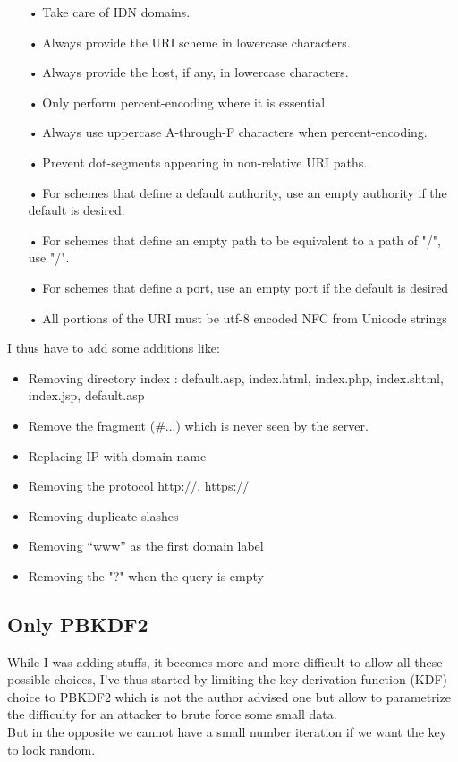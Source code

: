 \documentclass{eplmastersthesis}
\begin{document}
\begin{itemize}
\item[•] Take care of IDN domains.
\item[•] Always provide the URI scheme in lowercase characters.
\item[•] Always provide the host, if any, in lowercase characters.
\item[•] Only perform percent-encoding where it is essential.
\item[•] Always use uppercase A-through-F characters when percent-encoding.
\item[•] Prevent dot-segments appearing in non-relative URI paths.
\item[•] For schemes that define a default authority, use an empty authority if the default is desired.
\item[•] For schemes that define an empty path to be equivalent to a path of "/", use "/".
\item[•] For schemes that define a port, use an empty port if the default is desired
\item[•] All portions of the URI must be utf-8 encoded NFC from Unicode strings
\end{itemize}

I thus have to add some additions like:
\begin{itemize}
\item Removing directory index : {default.asp, index.html, index.php, index.shtml, index.jsp, default.asp}
\item Remove the fragment (\#...) which is never seen by the server.
\item Replacing IP with domain name 
\item Removing the protocol {http://, https://}
\item Removing duplicate slashes
\item Removing  “www” as the first domain label
\item Removing the "?" when the query is empty
\end{itemize}

\subsection{Only PBKDF2}
While I was adding stuffs, it becomes more and more difficult to allow all these possible choices, I've thus started by limiting the key derivation function (KDF) choice to PBKDF2 which is not the author advised one but allow to parametrize the difficulty for an attacker to brute force some small data.\\
But in the opposite we cannot have a small number iteration if we want the key to look random.
\end{document}
